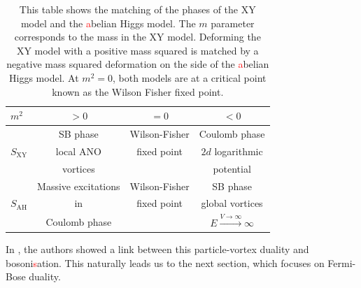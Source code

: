     \begin{table}
\begin{center}
  \begin{tabular}{| l | c | c | c|}
      \hline
    $m^2$           &  $>0$                  & $=0$                           &  $<0$                                               \\\hline
                    &  SB phase              & Wilson-Fisher &  Coulomb phase                                      \\                             
    $S_{\text{XY}}$ &  local ANO             &  fixed point                   &  $2d$ logarithmic                                   \\                           
                    &  vortices              &                                &  potential                                          \\\hline
                    &   Massive excitations  & Wilson-Fisher &  SB phase                                           \\                
    $S_{\text{AH}}$ &  in                    & fixed point                    &  global vortices                                    \\                                  
                    &  Coulomb phase         &                                &  $E\xrightarrow{V \rightarrow \infty} \infty$       \\                      
    \hline
  \end{tabular}
\end{center}
        \caption[This table shows the matching of the phases of the XY model and the \textcolor{red}{a}belian Higgs model.]{This table shows the matching of the phases of the XY model and the \textcolor{red}{a}belian Higgs model. The $m$ parameter corresponds to the mass in the XY model. Deforming the XY model with a positive mass squared is matched by a negative mass squared deformation on the side of the \textcolor{red}{a}belian Higgs model. At $m^2=0$, both models are at a critical point known as the Wilson Fisher fixed point. }
        \label{table:PV_Duality}
    \end{table}
In \cite{Karch:2016sxi}, the authors showed a link between this particle-vortex duality and bosoni\textcolor{red}{s}ation. This naturally leads us to the next section, which focuses on Fermi-Bose duality.
%

